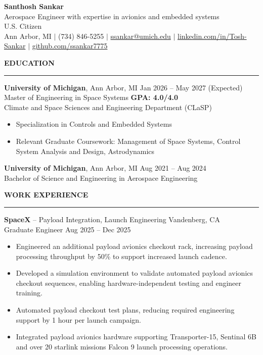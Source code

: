 \documentclass[10pt]{article}
\newcommand{\ressection}[1]{
  \vspace{0.12em}
  {\large\bfseries #1}\par
  \vspace{0.05em}\hrule\vspace{0.12em}
}
\begin{document}
\begin{center}
{\LARGE {\bfseries Santhosh Sankar}} \\
{\small Aerospace Engineer with expertise in avionics and embedded systems} \\
{\small U.S. Citizen} \\
Ann Arbor, MI \enspace $\vert$ \enspace (734) 846-5255 \enspace $\vert$ \enspace
\href{mailto:ssankar@umich.edu}{ssankar@umich.edu} \enspace $\vert$ \enspace
\href{https://www.linkedin.com/in/santhosh-sankar-3241521b8/}{linkedin.com/in/Tosh-Sankar} \enspace $\vert$ \enspace
\href{https://github.com/ssankar7775}{github.com/ssankar7775}
\end{center}

\ressection{EDUCATION}

{\bfseries University of Michigan}, Ann Arbor, MI \hfill Jan 2026 -- May 2027 (Expected) \\
Master of Engineering in Space Systems \hfill {\bfseries GPA: 4.0/4.0} \\
Climate and Space Sciences and Engineering Department (CLaSP)

\begin{itemize}
  \item Specialization in Controls and Embedded Systems
  \item Relevant Graduate Coursework: Management of Space Systems, Control System Analysis and Design, Astrodynamics
\end{itemize}

{\bfseries University of Michigan}, Ann Arbor, MI \hfill Aug 2021 -- Aug 2024 \\
Bachelor of Science and Engineering in Aerospace Engineering

\ressection{WORK EXPERIENCE}

{\bfseries SpaceX} -- Payload Integration, Launch Engineering \hfill Vandenberg, CA \\
Graduate Engineer \hfill Aug 2025 -- Dec 2025
\begin{itemize}
\item Engineered an additional payload avionics checkout rack, increasing payload processing throughput by 50\% to support increased launch cadence.
\item Developed a simulation environment to validate automated payload avionics checkout sequences, enabling hardware-independent testing and engineer training.
\item Automated payload checkout test plans, reducing required engineering support by 1 hour per launch campaign.
\item Integrated payload avionics hardware supporting Transporter-15, Sentinal 6B and over 20 starlink missions Falcon 9 launch processing operations.
\end{itemize}
\end{document}
